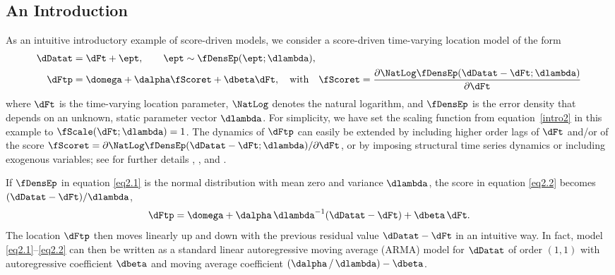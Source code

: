 \subsection{An Introduction} \label{sec2.1}

As an intuitive introductory example of score-driven models, we
consider a score-driven time-varying location model of the form
\begin{align}
    \label{eq2.1}
    \dDatat &= \dFt + \ept,
    \qquad
    \ept \sim \fDensEp(\ept; \dlambda),
    \\
    \label{eq2.2}
    \dFtp &= \domega + \dalpha \fScoret + \dbeta\dFt, \quad \text{with} \quad  \fScoret = \frac{\partial \NatLog \fDensEp(\dDatat - \dFt; \dlambda)}{\partial\dFt}
\end{align}
where $\dFt$ is the time-varying location parameter, $\NatLog$ denotes the natural logarithm, and $\fDensEp$ is the error density that depends on an unknown, static parameter vector $\dlambda$. 
For simplicity, we have set the scaling function from equation~\eqref{intro2} in this example to $\fScale(\dFt; \dlambda) = 1$.
The dynamics of $\dFtp$ can easily be extended by including higher order lags of $\dFt$ and/or of the score $\fScoret = \partial\NatLog\fDensEp(\dDatat-\dFt;\dlambda)/\partial \dFt$, or by imposing structural time series dynamics or including exogenous variables; see for further details \citet{CKL2013}, \citet{harveyluati2014}, and \citet{ordkoehlersnyder1997}.



If $\fDensEp$ in equation \eqref{eq2.1} is the normal distribution with mean zero and variance $\dlambda$, the score in equation \eqref{eq2.2} becomes $(\dDatat - \dFt)/\dlambda$,
\[
	\dFtp = \domega + \dalpha\,\dlambda^{-1}(\dDatat - \dFt) + \dbeta\,\dFt.
\] 
The location $\dFtp$ then moves linearly up and down with the previous residual value $\dDatat - \dFt$ in an intuitive way. In fact, model \eqref{eq2.1}--\eqref{eq2.2} can then be written as a standard linear autoregressive moving average (ARMA) model for $\dDatat$ of order $(1,1)$ with autoregressive coefficient $\dbeta$ and moving average coefficient $(\dalpha \, / \, \dlambda)-\dbeta$.

